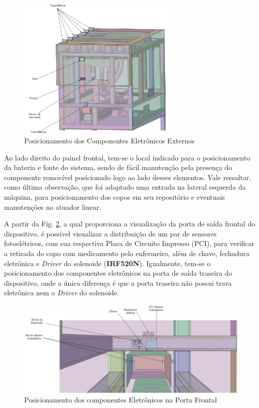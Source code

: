 \begin{figure}[H]
        \centering
        \includegraphics[width=0.70\textwidth]{figuras/integracao/Integracao_1.png}
        \caption{Posicionamento dos Componentes Eletrônicos Externos}
        \label{fig:Vista_componentes_externos}
    \end{figure}

Ao lado direito do painel frontal, tem-se o local indicado para o posicionamento da bateria e fonte do sistema, sendo de fácil manutenção pela presença do componente removível posicionado logo ao lado desses elementos. Vale ressaltar, como última observação, que foi adaptado uma entrada na lateral esquerda da máquina, para posicionamento dos copos em seu repositório e eventuais manutenções no atuador linear.


 A partir da Fig. \ref{fig:Vista_componentes_porta}, a qual proporciona a visualização da porta de saída frontal do dispositivo, é possível visualizar a distribuição de um par de  sensores fotoelétricos, com sua respectiva Placa de Circuito Impresso (PCI), para verificar a retirada do copo com medicamento pelo enfermeiro, além de chave, fechadura eletrônica e \textit{Driver} do solenoide (\textbf{IRF520N}). Igualmente, tem-se o posicionamento dos componentes eletrônicos na porta de saída traseira do dispositivo, onde a única diferença é que a porta traseira não possui trava eletrônica nem o \textit{Driver} do solenoide.
 

\begin{figure}[H]
        \centering
        \includegraphics[width=\textwidth]{figuras/integracao/Integracao_2.png}
        \caption{Posicionamento dos componentes Eletrônicos na Porta Frontal}
        \label{fig:Vista_componentes_porta}
    \end{figure}
    

